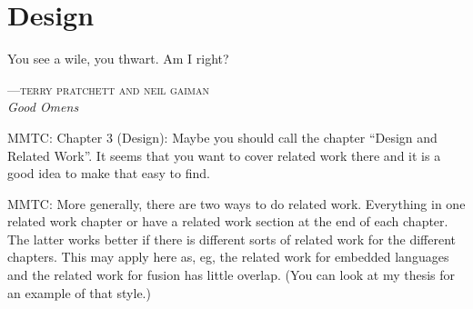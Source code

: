 %
%
%
%

\chapter{Design}
\epigraph{You see a wile, you thwart. Am I right?}%
{\textsc{---terry pratchett and neil gaiman}\\\textit{Good Omens}}

MMTC: Chapter 3 (Design): Maybe you should call the chapter ``Design and Related
Work''. It seems that you want to cover related work there and it is a good idea
to make that easy to find.

MMTC: More generally, there are two ways to do related work. Everything in one
related work chapter or have a related work section at the end of each chapter.
The latter works better if there is different sorts of related work for the
different chapters. This may apply here as, eg, the related work for embedded
languages and the related work for fusion has little overlap. (You can look at
my thesis for an example of that style.)


